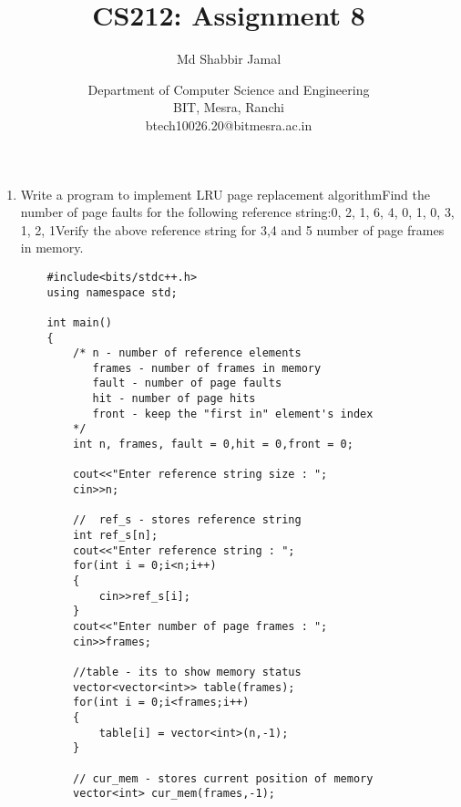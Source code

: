 \documentclass{article}
\title{CS212: Assignment 8}
\author{Md Shabbir Jamal}
\date{Department of Computer Science and Engineering\\
BIT, Mesra, Ranchi\\
btech10026.20@bitmesra.ac.in
}
\begin{document}
\maketitle

\begin{enumerate}
    
\item {{\large Write a program to implement LRU page replacement algorithmFind the number of page faults for the following reference string:0, 2, 1, 6, 4, 0, 1, 0, 3, 1, 2, 1Verify the above reference string for 3,4 and 5 number of page frames in memory.}
\begin{verbatim}
    #include<bits/stdc++.h>
    using namespace std;
    
    int main()
    {
        /* n - number of reference elements
           frames - number of frames in memory
           fault - number of page faults
           hit - number of page hits
           front - keep the "first in" element's index
        */
        int n, frames, fault = 0,hit = 0,front = 0;
    
        cout<<"Enter reference string size : ";
        cin>>n;
    
        //  ref_s - stores reference string
        int ref_s[n];
        cout<<"Enter reference string : ";
        for(int i = 0;i<n;i++)
        {
            cin>>ref_s[i];
        }
        cout<<"Enter number of page frames : ";
        cin>>frames;
    
        //table - its to show memory status
        vector<vector<int>> table(frames);
        for(int i = 0;i<frames;i++)
        {
            table[i] = vector<int>(n,-1);
        }
    
        // cur_mem - stores current position of memory
        vector<int> cur_mem(frames,-1);
    

\end{verbatim}}
\end{enumerate}
\end{document}
